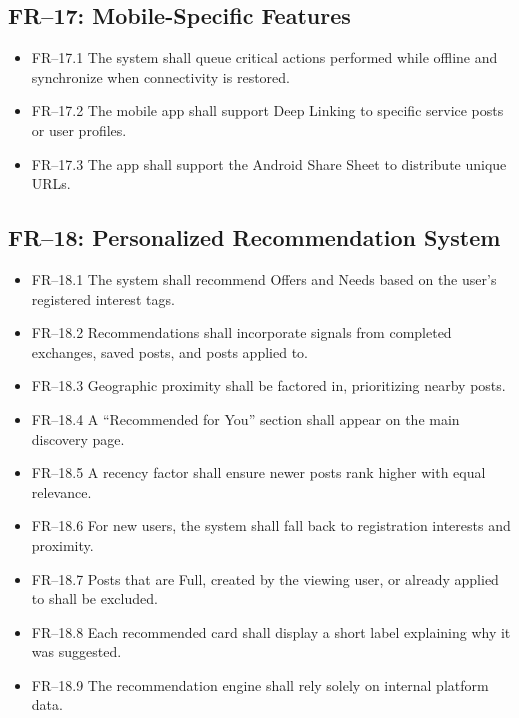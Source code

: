 \documentclass[10pt,a4paper]{report}
\begin{document}
\subsection{FR--17: Mobile-Specific Features}
\begin{itemize}
    \item FR--17.1 The system shall queue critical actions performed while offline and synchronize when connectivity is restored.
    \item FR--17.2 The mobile app shall support Deep Linking to specific service posts or user profiles.
    \item FR--17.3 The app shall support the Android Share Sheet to distribute unique URLs.
\end{itemize}

\subsection{FR--18: Personalized Recommendation System}
\begin{itemize}
    \item FR--18.1 The system shall recommend Offers and Needs based on the user's registered interest tags.
    \item FR--18.2 Recommendations shall incorporate signals from completed exchanges, saved posts, and posts applied to.
    \item FR--18.3 Geographic proximity shall be factored in, prioritizing nearby posts.
    \item FR--18.4 A ``Recommended for You'' section shall appear on the main discovery page.
    \item FR--18.5 A recency factor shall ensure newer posts rank higher with equal relevance.
    \item FR--18.6 For new users, the system shall fall back to registration interests and proximity.
    \item FR--18.7 Posts that are Full, created by the viewing user, or already applied to shall be excluded.
    \item FR--18.8 Each recommended card shall display a short label explaining why it was suggested.
    \item FR--18.9 The recommendation engine shall rely solely on internal platform data.
\end{itemize}
\end{document}
